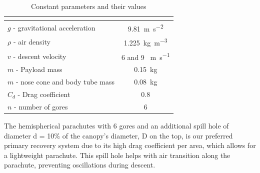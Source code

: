 \begin{table}[htbp]
\centering
{}
\begin{tabular}{>{\centering\arraybackslash}lc}
\rowcolor{DeepSkyBlue4}
\hline
\multicolumn{1}{|c|}{\textbf{\color{white!50}{Parameter}}}  & \textbf{\color{white!50}{Value}} \\
\hline
$g$ - gravitational acceleration & \SI{9.81 }{\meter\per\square\second} \\
\rowcolor{LightCyan1!50}$\rho$ - air density & \SI{1.225}{\kilogram\per\cubic\metre} \\
$v$ - descent velocity & 6 and 9 \SI{}{\meter\per\second} \\
\rowcolor{LightCyan1!50}$m$ - Payload mass & \SI{0.15}{\kilogram} \\
$m$ - nose cone and body tube mass & \SI{0.08}{\kilogram} \\
\rowcolor{LightCyan1!50}$C_d$ - Drag coefficient & 0.8 \\
$n$ - number of gores & 6 \\
\hline
\end{tabular}
\caption{Constant parameters and their values}
\end{table}

The hemispherical parachutes with 6 gores and an additional spill hole of diameter d = 10\% of the canopy’s diameter, D on the top, is our preferred primary recovery system due to its high drag coefficient per area, which allows for a lightweight parachute. This spill hole helps with air transition along the parachute, preventing oscillations during descent.


